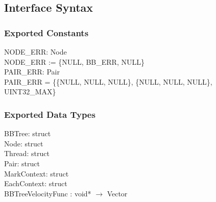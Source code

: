 \documentclass[12pt]{article}
\begin{document}
\subsection{Interface Syntax}

\subsubsection{Exported Constants} \label{SecECLinked}
	NODE_ERR: Node \\
	NODE_ERR := \{NULL, BB_ERR, NULL\} \\
	\newline
	PAIR_ERR: Pair \\
	PAIR_ERR = \{\{NULL, NULL, NULL\}, \{NULL, NULL, NULL\}, UINT32_MAX\}
	

\subsubsection{Exported Data Types} \label{SecEDTLinked}
	BBTree: struct \\
	Node: struct \\
	Thread: struct \\
	Pair: struct \\
	MarkContext: struct \\
	EachContext: struct \\
	BBTreeVelocityFunc : void* $\to$ Vector 
\end{document}
